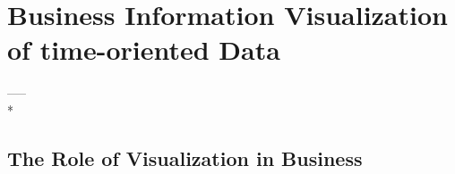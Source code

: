 \chapter{Business Information Visualization of time-oriented Data}
\label{chap:BIV}

----- \\*
\section{The Role of Visualization in Business}

